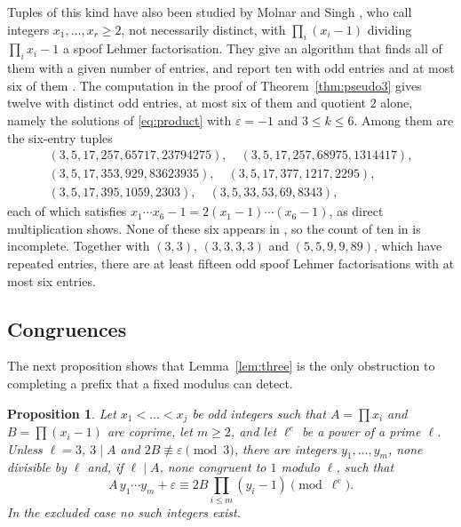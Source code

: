 \documentclass[11pt,reqno]{amsart}
\numberwithin{equation}{section}
\theoremstyle{plain}
\newtheorem{proposition}[theorem]{Proposition}
\theoremstyle{definition}
\theoremstyle{remark}
\begin{document}
Tuples of this kind have also been studied by Molnar and Singh
\cite{MS25}, who call integers $x_1,\dots,x_r\ge2$, not necessarily
distinct, with $\prod_i(x_i-1)$ dividing $\prod_ix_i-1$ a spoof Lehmer
factorisation. They give an algorithm that finds all of them with a
given number of entries, and report ten with odd entries and at most
six of them \cite[Theorem~1.2]{MS25}. The computation in the proof of
Theorem~\ref{thm:pseudo3} gives twelve with distinct odd entries, at
most six of them and quotient $2$ alone, namely the solutions of
\eqref{eq:product} with $\varepsilon=-1$ and $3\le k\le6$. Among them
are the six-entry tuples
\begin{gather*}
  (3,5,17,257,65717,23794275),\quad (3,5,17,257,68975,1314417),\\
  (3,5,17,353,929,83623935),\quad (3,5,17,377,1217,2295),\\
  (3,5,17,395,1059,2303),\quad (3,5,33,53,69,8343),
\end{gather*}
each of which satisfies $x_1\cdots x_6-1=2(x_1-1)\cdots(x_6-1)$, as
direct multiplication shows. None of these six appears in \cite{MS25},
so the count of ten in \cite[Theorem~1.2]{MS25} is incomplete.
Together with $(3,3)$, $(3,3,3,3)$ and
$(5,5,9,9,89)$, which have repeated entries, there are at least fifteen
odd spoof Lehmer factorisations with at most six entries.

\subsection{Congruences}
The next proposition shows that Lemma~\ref{lem:three} is the only
obstruction to completing a prefix that a fixed modulus can detect.

\begin{proposition}\label{prop:local}
Let $x_1<\dots<x_j$ be odd integers such that $A=\prod x_i$ and
$B=\prod(x_i-1)$ are coprime, let $m\ge2$, and let $\ell^e$ be a power of
a prime $\ell$. Unless $\ell=3$, $3\mid A$ and $2B\not\equiv\varepsilon\pmod3$,
there are integers $y_1,\dots,y_m$, none divisible by $\ell$ and, if
$\ell\mid A$, none congruent to $1$ modulo $\ell$, such that
\[
  A\,y_1\cdots y_m+\varepsilon\equiv2B\prod_{i\le m}(y_i-1)\pmod{\ell^e}.
\]
In the excluded case no such integers exist.
\end{proposition}
\end{document}
